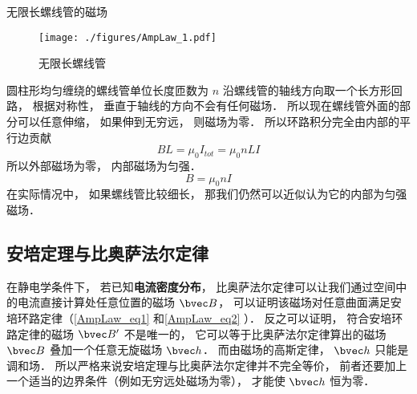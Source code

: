 \begin{example}{无限长螺线管的磁场}\label{AmpLaw_ex2}
\begin{figure}[ht]
\centering
\texttt{[image: ./figures/AmpLaw\_1.pdf]}
\caption{无限长螺线管} \label{AmpLaw_fig1}
\end{figure}
圆柱形均匀缠绕的螺线管单位长度匝数为 $n$ 沿螺线管的轴线方向取一个长方形回路， 根据对称性， 垂直于轴线的方向不会有任何磁场． 所以现在螺线管外面的部分可以任意伸缩， 如果伸到无穷远， 则磁场为零． 所以环路积分完全由内部的平行边贡献
\begin{equation}
BL = \mu_0 I_{tot} = \mu_0 nLI
\end{equation}
所以外部磁场为零， 内部磁场为匀强．
\begin{equation}
B = \mu_0 nI
\end{equation}
在实际情况中， 如果螺线管比较细长， 那我们仍然可以近似认为它的内部为匀强磁场．
\end{example}

\subsection{安培定理与比奥萨法尔定律}

在静电学条件下， 若已知\textbf{电流密度分布}， 比奥萨法尔定律可以让我们通过空间中的电流直接计算处任意位置的磁场 $\bvec B$， 可以证明该磁场对任意曲面满足安培环路定律（\autoref{AmpLaw_eq1} 和\autoref{AmpLaw_eq2} ）． 反之可以证明， 符合安培环路定律的磁场 $\bvec B'$ 不是唯一的， 它可以等于比奥萨法尔定律算出的磁场 $\bvec B$ 叠加一个任意无旋磁场 $\bvec h$． 而由磁场的高斯定律， $\bvec h$ 只能是调和场． 所以严格来说安培定理与比奥萨法尔定律并不完全等价， 前者还要加上一个适当的边界条件（例如无穷远处磁场为零）， 才能使 $\bvec h$ 恒为零．

